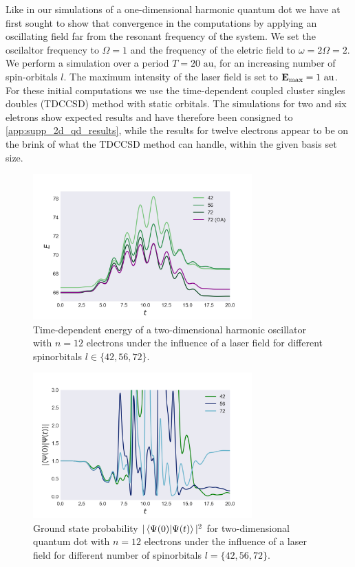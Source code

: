 Like in our simulations of a one-dimensional harmonic quantum dot we have at first 
sought to show that convergence in the computations by applying an oscillating 
field far from the resonant frequency of the system. We set the oscilaltor frequency 
to $\Omega=1$ and the frequency of the eletric field to $\omega=2\Omega=2$. We 
perform a simulation over a period $T = 20 \text{ au}$, for an increasing 
number of spin-orbitals $l$. The maximum intensity of the laser field is set to 
$\vb{E}_\text{max} = 1 \text{ au}$. For these initial computations we use the 
time-dependent coupled cluster singles doubles (TDCCSD) method with static 
orbitals. The simulations for two and six eletrons show expected results and have
therefore been consigned to \autoref{app:supp_2d_qd_results}, while the results for
twelve electrons appear to be on the brink of what the TDCCSD method 
can handle, within the given basis set size.

\begin{figure}
    \centering
    \includegraphics[width=0.75\textwidth]{results/figures/2D/n12_energy.png} 
    \caption{Time-dependent energy of a two-dimensional harmonic oscillator 
        with $n=12$ electrons under the influence of a laser field for different 
        spinorbitals $l\in\{42,56,72\}$.
    }
    \label{fig:n12_2d_energy}
\end{figure}

\begin{figure}
    \centering
    \includegraphics[width=0.75\textwidth]{results/figures/2D/n12_overlap.png} 
    \caption{Ground state probability $|\braket{\Psi(0)}{\Psi(t)}|^2$ for two-dimensional
        quantum dot with $n=12$ electrons under the influence of a laser field for 
        different number of spinorbitals $l=\{42,56,72\}$. 
    }
    \label{fig:n12_2d_overlap}
\end{figure}

